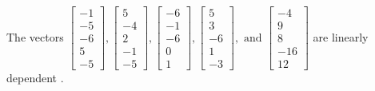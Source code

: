 \begin{exercise}
\begin{exerciseStatement}
  \end{exerciseStatement}
  \begin{exerciseAnswer}
   The vectors \(\left[\begin{array}{r}
-1 \\
-5 \\
-6 \\
5 \\
-5
\end{array}\right] , \left[\begin{array}{r}
5 \\
-4 \\
2 \\
-1 \\
-5
\end{array}\right] , \left[\begin{array}{r}
-6 \\
-1 \\
-6 \\
0 \\
1
\end{array}\right] , \left[\begin{array}{r}
5 \\
3 \\
-6 \\
1 \\
-3
\end{array}\right] , \text{ and } \left[\begin{array}{r}
-4 \\
9 \\
8 \\
-16 \\
12
\end{array}\right]\) are 
  	 linearly dependent  .
  


  \end{exerciseAnswer}
\end{exercise}